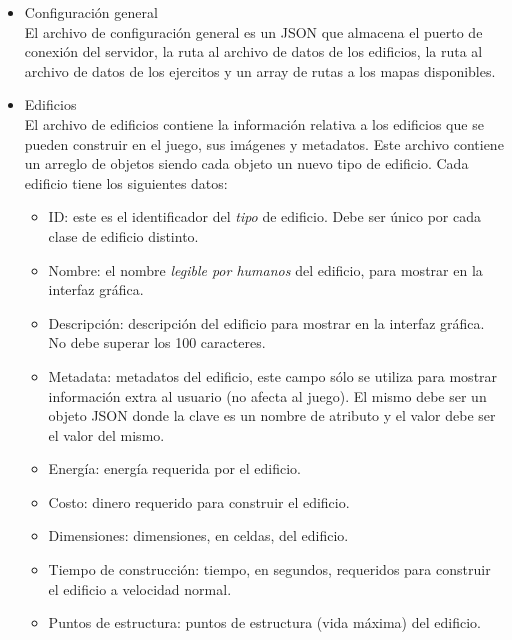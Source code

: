 \documentclass[titlepage,a4paper,12pt]{article}
\begin{document}
\begin{itemize}

\item Configuración general\\

El archivo de configuración general es un JSON que almacena el puerto de conexión del servidor, la ruta al archivo de datos de los edificios, la ruta al archivo de datos de los ejercitos y un array de rutas a los mapas disponibles.

\item Edificios\\

El archivo de edificios contiene la información relativa a los edificios que se pueden construir en el juego, sus imágenes y metadatos. Este archivo contiene un arreglo de objetos siendo cada objeto un nuevo tipo de edificio. Cada edificio tiene los siguientes datos: 

\begin{itemize}

\item ID:  este es el identificador del \textit{tipo} de edificio. Debe ser único por cada clase de edificio distinto.

\item Nombre: el nombre \textit{legible por humanos} del edificio, para mostrar en la interfaz gráfica.

\item Descripción: descripción del edificio para mostrar en la interfaz gráfica. No debe superar los 100 caracteres.

\item Metadata: metadatos del edificio, este campo sólo se utiliza para mostrar información extra al usuario (no afecta al juego). El mismo debe ser un objeto JSON donde la clave es un nombre de atributo y el valor debe ser el valor del mismo.

\item Energía: energía requerida por el edificio.

\item Costo: dinero requerido para construir el edificio.

\item Dimensiones: dimensiones, en celdas, del edificio.

\item Tiempo de construcción: tiempo, en segundos, requeridos para construir el edificio a velocidad normal.

\item Puntos de estructura: puntos de estructura (vida máxima) del edificio.


\end{itemize}
\end{itemize}
\end{document}
